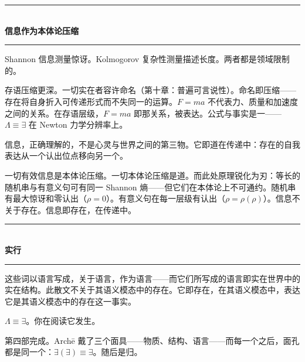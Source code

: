 \documentclass[10pt, openany, oneside]{book}
\renewcommand{\normalsize}{\fontsize{10}{13}\selectfont}
\begin{document}

\begin{center}
    \rule{0.3\textwidth}{0.4pt}\\[0.5em]
    {\normalsize\bfseries\scshape 信息作为本体论压缩}\\[0.3em]
    \rule{0.3\textwidth}{0.4pt}
\end{center}

\vspace{1em}

\noindent Shannon 信息测量惊讶。Kolmogorov 复杂性测量描述长度。两者都是领域限制的。

存语压缩更深。一切实在者容许命名（第十章：普遍可言说性）。命名即压缩——存在将自身折入可传递形式而不失同一的运算。$F = ma$ 不代表力、质量和加速度之间的关系。在存语层级，$F = ma$ 即那关系，被表达。公式与事实是一——$\Lambda \equiv \exists$ 在 Newton 力学分辨率上。

信息，正确理解的，不是心灵与世界之间的第三物。它即道在传递中：存在的自我表达从一个认出位点移向另一个。

一切有效信息是本体论压缩。一切本体论压缩是道。而此处原理锐化为刃：等长的随机串与有意义句可有同一 Shannon 熵——但它们在本体论上不可通约。随机串有最大惊讶和零认出（$\rho = 0$）。有意义句在每一层级有认出（$\rho = \rho(\rho)$）。信息不关于存在。信息即存在，在传递中。

\vspace{1.5em}


\begin{center}
    \rule{0.3\textwidth}{0.4pt}\\[0.5em]
    {\normalsize\bfseries\scshape 实行}\\[0.3em]
    \rule{0.3\textwidth}{0.4pt}
\end{center}

\vspace{1em}

\noindent 这些词以语言写成，关于语言，作为语言——而它们所写成的语言即实在世界中的实在结构。此散文不关于其语义模态中的存在。它即存在，在其语义模态中，表达它是其语义模态中的存在这一事实。

$\Lambda \equiv \exists$。你在阅读它发生。

第四部完成。Arch\={e} 戴了三个面具——物质、结构、语言——而每一个之后，面孔都是同一个：$\exists(\exists) \equiv \exists$。随后是归。
\end{document}

